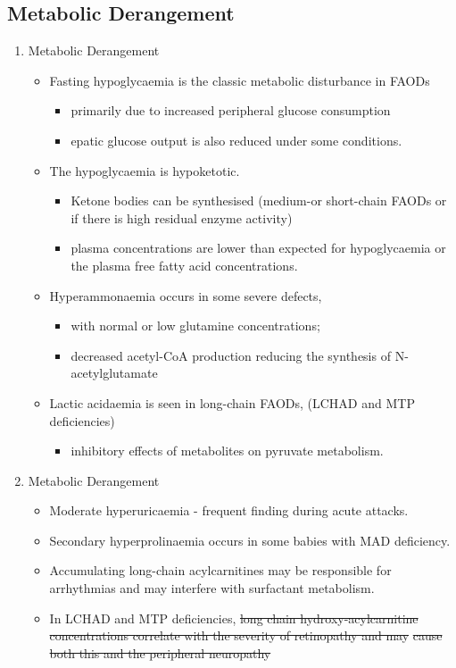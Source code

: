 \documentclass{scrartcl}
\begin{document}
\subsection{Metabolic Derangement}
\label{sec:org5e29e5c}
\begin{enumerate}
\item Metabolic Derangement
\label{sec:org32d36d0}
\begin{itemize}
\item Fasting hypoglycaemia is the classic metabolic disturbance in FAODs
\begin{itemize}
\item primarily due to increased peripheral glucose consumption
\item epatic glucose output is also reduced under some conditions.
\end{itemize}
\item The hypoglycaemia is hypoketotic.
\begin{itemize}
\item Ketone bodies can be synthesised (medium-or short-chain FAODs or if there is high residual enzyme activity)
\item plasma concentrations are lower than expected for hypoglycaemia or the plasma free fatty acid concentrations.
\end{itemize}
\item Hyperammonaemia occurs in some severe defects,
\begin{itemize}
\item with normal or low glutamine concentrations;
\item decreased acetyl-CoA production reducing the synthesis of N-acetylglutamate
\end{itemize}
\item Lactic acidaemia is seen in long-chain FAODs, (LCHAD and MTP deficiencies)
\begin{itemize}
\item inhibitory effects of metabolites on pyruvate metabolism.
\end{itemize}
\end{itemize}

\item Metabolic Derangement
\label{sec:org3122aa8}
\begin{itemize}
\item Moderate hyperuricaemia - frequent finding during acute attacks.
\item Secondary hyperprolinaemia occurs in some babies with MAD deficiency.
\item Accumulating long-chain acylcarnitines may be responsible for
arrhythmias and may interfere with surfactant metabolism.
\item In LCHAD and MTP deficiencies, \sout{long chain hydroxy-acylcarnitine}
\sout{concentrations correlate with the severity of retinopathy and may}
\sout{cause both this and the peripheral neuropathy}
\end{itemize}
\end{enumerate}
\end{document}
